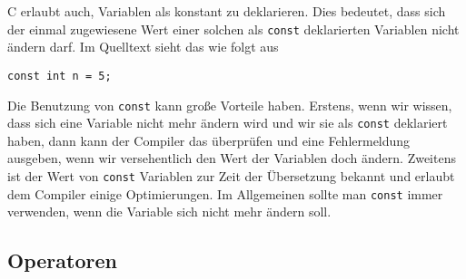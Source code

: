 C erlaubt auch, Variablen als konstant zu deklarieren. 
Dies bedeutet, dass sich der einmal zugewiesene Wert einer solchen als \verb|const| deklarierten Variablen nicht ändern darf.
Im Quelltext sieht das wie folgt aus
\begin{lstlisting}
const int n = 5;
\end{lstlisting}
Die Benutzung von \verb|const| kann große Vorteile haben.
Erstens, wenn wir wissen, dass sich eine Variable nicht mehr ändern wird und wir sie als  \verb|const| deklariert haben, dann kann der Compiler das überprüfen und eine Fehlermeldung ausgeben, wenn wir versehentlich den Wert der Variablen doch ändern.
Zweitens ist der Wert von \verb|const| Variablen zur Zeit der Übersetzung bekannt und erlaubt dem Compiler einige Optimierungen.
Im Allgemeinen sollte man \verb|const| immer verwenden, wenn die Variable sich nicht mehr ändern soll.

\subsection{Operatoren}

